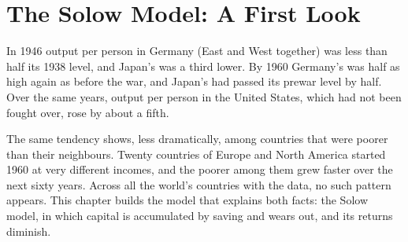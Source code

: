 \chapter{The Solow Model: A First Look}\label{ch:g12:solow-first-look}

In 1946 output per person in Germany (East and West together) was less than half its 1938 level, and Japan's was a third lower. By 1960 Germany's was half as high again as before the war, and
Japan's had passed its prewar level by half. Over the same years, output per person in the United States, which had not been fought over, rose by about a fifth.

The same tendency shows, less dramatically, among countries that were poorer than their neighbours. Twenty countries of Europe and North America started 1960 at
very different incomes, and the poorer among them grew faster over the next sixty years. Across all the world's countries with the data, no such pattern appears. This
chapter builds the model that explains both facts: the Solow model, in which capital is accumulated by saving and wears out, and its returns diminish.

